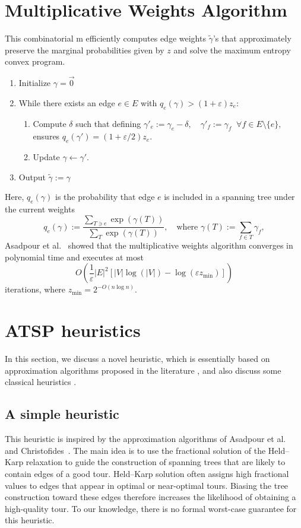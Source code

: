 \documentclass[12pt]{report}
\theoremstyle{definition}
\begin{document}
\section{Multiplicative Weights Algorithm}
This combinatorial m efficiently computes edge weights $\tilde \gamma$'s that approximately preserve the marginal probabilities given by $z$ and solve the maximum entropy convex program.

\begin{enumerate}  
    \item Initialize $\gamma = \vec{0}$
    \item While there exists an edge $e \in E$ with
    $q_e(\gamma) > (1+\varepsilon) z_e$:
    \begin{enumerate}
        \item Compute $\delta$ such that defining
        \(
        \gamma'_e := \gamma_e - \delta, \quad 
        \gamma'_f := \gamma_f \;\; \forall f \in E \setminus \{e\},
        \)
        ensures
        \(
        q_e(\gamma') = (1 + \varepsilon/2) z_e.
        \)
        \item Update $\gamma \gets \gamma'$.
    \end{enumerate}
    \item Output \(\tilde \gamma := \gamma\)
\end{enumerate}
Here, $q_e(\gamma)$ is the probability that edge $e$ is included in a spanning tree under the current weights 
\[
q_e(\gamma) := \frac{\sum_{T \ni e} \exp(\gamma(T))}{\sum_{T} \exp(\gamma(T))}, 
\quad \text{where } \gamma(T) := \sum_{f \in T} \gamma_f,
\]
Asadpour et al.~\cite{asadpour} showed that the multiplicative weights algorithm converges in polynomial time and executes at most \[O\left(\frac{1}{\varepsilon} |E|^2 [|V| \log(|V|) - \log(\varepsilon z_{\min})]\right)\] iterations, where \(z_{\min} = 2^{-O(n \log n)}\).

\section{ATSP heuristics}
In this section, we discuss a novel heuristic, which is essentially based on approximation algorithms proposed in the literature \cite{asadpour, christofides1976}, and also discuss some classical heuristics \cite{frieze1982}.
\subsection{A simple heuristic}
\label{lp_guided_mst}
This heuristic is inspired by the approximation algorithms of Asadpour et al.~\cite{asadpour} and Christofides~\cite{christofides1976}. The main idea is to use the fractional solution of the Held--Karp relaxation to guide the construction of spanning trees that are likely to contain edges of a good tour. Held--Karp solution often assigns high fractional values to edges that appear in optimal or near-optimal tours. Biasing the tree construction toward these edges therefore increases the likelihood of obtaining a high-quality tour. To our knowledge, there is no formal worst-case guarantee for this heuristic.
\end{document}
